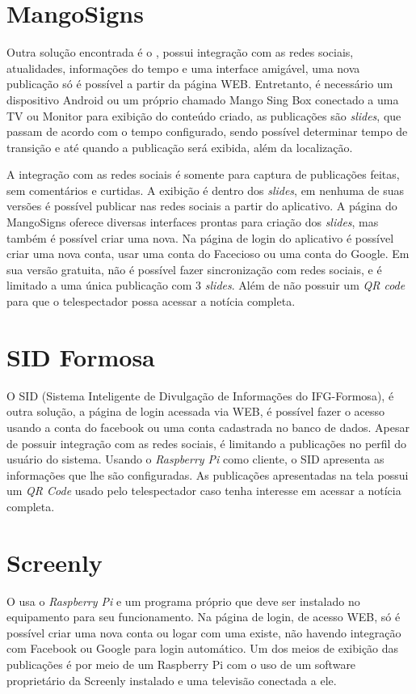 \section{MangoSigns}
\label{sec:mango}
Outra solução encontrada é o \cite{mango2017}, possui integração com as redes sociais, atualidades, informações do tempo e uma interface amigável, uma nova publicação só é possível a partir da página WEB. Entretanto, é necessário um dispositivo Android ou um próprio chamado Mango Sing Box conectado a uma TV ou Monitor para exibição do conteúdo criado, as publicações são \textit{slides}, que passam de acordo com o tempo configurado, sendo possível determinar tempo de transição e até quando a publicação será exibida, além da localização. 

A integração com as redes sociais é somente para captura de publicações feitas, sem comentários e curtidas. A exibição é dentro dos \textit{slides}, em nenhuma de suas versões é possível publicar nas redes sociais a partir do aplicativo. A página do MangoSigns oferece diversas interfaces prontas para criação dos \textit{slides}, mas também é possível criar uma nova. Na página de login do aplicativo é possível criar uma nova conta, usar uma conta do Facecioso ou uma conta do Google. Em sua versão gratuita, não é possível fazer sincronização com redes sociais, e é limitado a uma única publicação com 3 \textit{slides}. Além de não possuir um \textit{QR code} para que o telespectador possa acessar a notícia completa.

\section{SID Formosa}
\label{sec:sid}
O SID (Sistema Inteligente de Divulgação de Informações do IFG-Formosa), é outra solução, a página de login acessada via WEB, é possível fazer o acesso usando a conta do facebook ou uma conta cadastrada no banco de dados. Apesar de possuir integração com as redes sociais, é limitando a publicações no perfil do usuário do sistema. Usando o \textit{Raspberry Pi} como cliente, o SID apresenta as informações que lhe são configuradas. As publicações apresentadas na tela possui um \textit{QR Code} usado pelo telespectador caso tenha interesse em acessar a notícia completa. \cite{sobrinho2017}

\section{Screenly}
O \cite{screenly2017} usa o \textit{Raspberry Pi} e um programa próprio que deve ser instalado no equipamento para seu funcionamento. Na página de login, de acesso WEB, só é possível criar uma nova conta ou logar com uma existe, não havendo integração com Facebook ou Google para login automático. Um dos meios de exibição das publicações é por meio de um Raspberry Pi com o uso de um software proprietário da Screenly instalado e uma televisão conectada a ele. 

